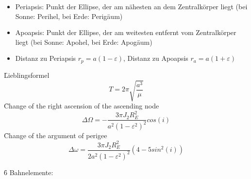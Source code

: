 \begin{itemize}
 \item Periapsis: Punkt der Ellipse, der am nähesten an dem Zentralkörper liegt (bei Sonne: Perihel, bei Erde: Perigäum)
 \item Apoapsis: Punkt der Ellipse, der am weitesten entfernt vom Zentralkörper liegt (bei Sonne: Apohel, bei Erde: Apogäum)
 \item Distanz zu Periapsis $r_p = a(1-\varepsilon)$, Distanz zu Apoapsis $r_a = a(1+\varepsilon)$
\end{itemize}
\noindent \f{Lieblingsformel}
\[T = 2\pi\sqrt{\frac{a^3}{\mu}}\]
\f{Change of the right ascension of the ascending node}
\[\Delta \Omega = - \frac{3\pi J_2R_E^2}{a^2(1-\varepsilon^2)^2}cos(i)\]
\f{Change of the argument of perigee}
\[\Delta \omega = \frac{3\pi J_2R_E^2}{2a^2(1-\varepsilon^2)^2}(4-5sin^2(i))\]

\f{6 Bahnelemente:}
\vspace*{10pt}


